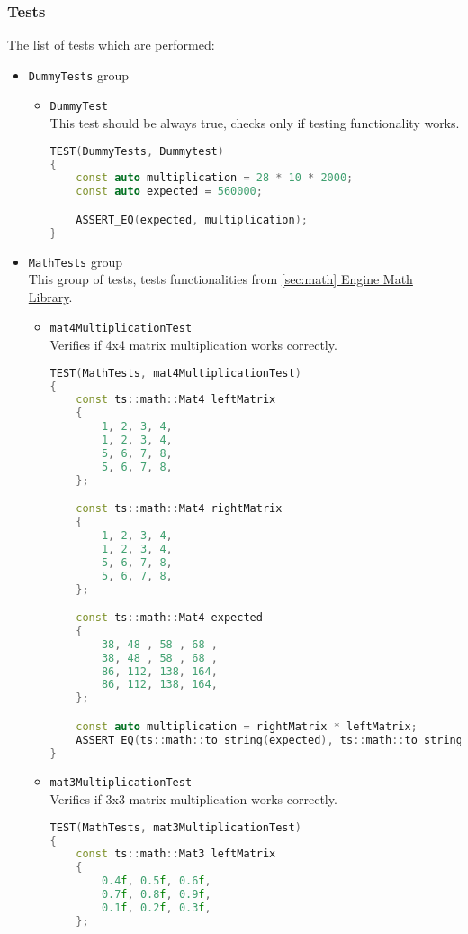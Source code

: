 \subsubsection{Tests}
The list of tests which are performed:
\begin{itemize}
    \item \texttt{DummyTests} group
        \begin{itemize}
            \item \texttt{DummyTest}\\
            This test should be always true, checks only if testing functionality works.
\begin{lstlisting}[language=c++, caption=\texttt{Dummytest} test (./engine/tests/tester.cpp)]
TEST(DummyTests, Dummytest)
{
    const auto multiplication = 28 * 10 * 2000;
    const auto expected = 560000;

    ASSERT_EQ(expected, multiplication);
}
\end{lstlisting}
        \end{itemize}
    \item \texttt{MathTests} group\\
        This group of tests, tests functionalities from \hyperref[sec:math]{\ref*{sec:math} Engine Math Library}.
        \begin{itemize}
            \item \texttt{mat4MultiplicationTest}\\
            Verifies if 4x4 matrix multiplication works correctly.
\begin{lstlisting}[language=c++, caption=\texttt{mat4MultiplicationTest} test (./engine/tests/tester.cpp)]
TEST(MathTests, mat4MultiplicationTest)
{
    const ts::math::Mat4 leftMatrix
    {
        1, 2, 3, 4,
        1, 2, 3, 4,
        5, 6, 7, 8,
        5, 6, 7, 8,
    };

    const ts::math::Mat4 rightMatrix
    {
        1, 2, 3, 4,
        1, 2, 3, 4,
        5, 6, 7, 8,
        5, 6, 7, 8,
    };

    const ts::math::Mat4 expected
    {
        38, 48 , 58 , 68 ,
        38, 48 , 58 , 68 ,
        86, 112, 138, 164,
        86, 112, 138, 164,
    };

    const auto multiplication = rightMatrix * leftMatrix;
    ASSERT_EQ(ts::math::to_string(expected), ts::math::to_string(multiplication));
}
\end{lstlisting}
            \item \texttt{mat3MultiplicationTest}\\ Verifies if 3x3 matrix multiplication works correctly.
\begin{lstlisting}[language=c++, caption=\texttt{mat3MultiplicationTest} test (./engine/tests/tester.cpp)]
TEST(MathTests, mat3MultiplicationTest)
{
    const ts::math::Mat3 leftMatrix
    {
        0.4f, 0.5f, 0.6f,
        0.7f, 0.8f, 0.9f,
        0.1f, 0.2f, 0.3f,
    };


\end{lstlisting}
\end{itemize}
\end{itemize}
